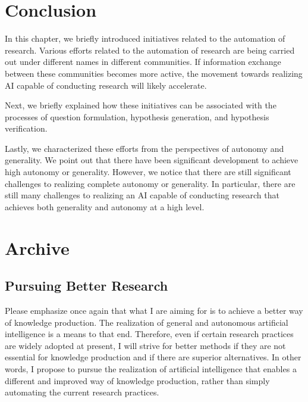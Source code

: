 \documentclass{article}
\begin{document}
\section{Conclusion}
In this chapter, we briefly introduced initiatives related to the automation of research. Various efforts related to the automation of research are being carried out under different names in different communities. If information exchange between these communities becomes more active, the movement towards realizing AI capable of conducting research will likely accelerate.

Next, we briefly explained how these initiatives can be associated with the processes of question formulation, hypothesis generation, and hypothesis verification.

Lastly, we characterized these efforts from the perspectives of autonomy and generality. We point out that there have been significant development to achieve high autonomy or generality. However, we notice that there are still significant challenges to realizing complete autonomy or generality. In particular, there are still many challenges to realizing an AI capable of conducting research that achieves both generality and autonomy at a high level.

\section{Archive}

\subsection{Pursuing Better Research}
Please emphasize once again that what I are aiming for is to achieve a better way of knowledge production. The realization of general and autonomous artificial intelligence is a means to that end. Therefore, even if certain research practices are widely adopted at present, I will strive for better methods if they are not essential for knowledge production and if there are superior alternatives. In other words, I propose to pursue the realization of artificial intelligence that enables a different and improved way of knowledge production, rather than simply automating the current research practices.
\end{document}
